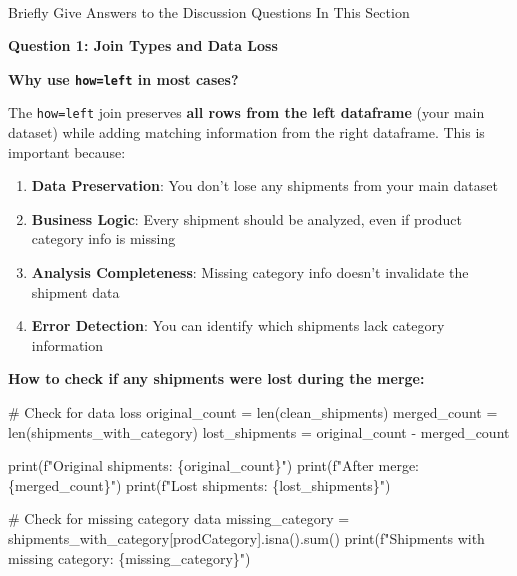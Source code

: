 \documentclass[
  letterpaper,
  DIV=11,
  numbers=noendperiod]{scrartcl}
\makeatletter
\let\oldparagraph\paragraph
\renewcommand{\paragraph}{
    \@ifstar
      \xxxParagraphStar
      \xxxParagraphNoStar
  }
\newcommand{\xxxParagraphStar}[1]{\oldparagraph*{#1}\mbox{}}
\newcommand{\xxxParagraphNoStar}[1]{\oldparagraph{#1}\mbox{}}
\newenvironment{Shaded}{\begin{snugshade}}{\end{snugshade}}
\newcommand{\BuiltInTok}[1]{\textcolor[rgb]{0.00,0.23,0.31}{#1}}
\newcommand{\CommentTok}[1]{\textcolor[rgb]{0.37,0.37,0.37}{#1}}
\newcommand{\NormalTok}[1]{\textcolor[rgb]{0.00,0.23,0.31}{#1}}
\newcommand{\OperatorTok}[1]{\textcolor[rgb]{0.37,0.37,0.37}{#1}}
\newcommand{\SpecialCharTok}[1]{\textcolor[rgb]{0.37,0.37,0.37}{#1}}
\newcommand{\SpecialStringTok}[1]{\textcolor[rgb]{0.13,0.47,0.30}{#1}}
\newcommand{\StringTok}[1]{\textcolor[rgb]{0.13,0.47,0.30}{#1}}
\providecommand{\tightlist}{%
  \setlength{\itemsep}{0pt}\setlength{\parskip}{0pt}}
\makeatother
\begin{document}
\paragraph{Briefly Give Answers to the Discussion Questions In This
Section}\label{briefly-give-answers-to-the-discussion-questions-in-this-section-5}

\textbf{Question 1: Join Types and Data Loss}

\textbf{Why use \texttt{how=\textquotesingle{}left\textquotesingle{}} in
most cases?}

The \texttt{how=\textquotesingle{}left\textquotesingle{}} join preserves
\textbf{all rows from the left dataframe} (your main dataset) while
adding matching information from the right dataframe. This is important
because:

\begin{enumerate}
\def\labelenumi{\arabic{enumi}.}
\tightlist
\item
  \textbf{Data Preservation}: You don't lose any shipments from your
  main dataset
\item
  \textbf{Business Logic}: Every shipment should be analyzed, even if
  product category info is missing
\item
  \textbf{Analysis Completeness}: Missing category info doesn't
  invalidate the shipment data
\item
  \textbf{Error Detection}: You can identify which shipments lack
  category information
\end{enumerate}

\textbf{How to check if any shipments were lost during the merge:}

\begin{Shaded}
\begin{Highlighting}[]
\CommentTok{\# Check for data loss}
\NormalTok{original\_count }\OperatorTok{=} \BuiltInTok{len}\NormalTok{(clean\_shipments)}
\NormalTok{merged\_count }\OperatorTok{=} \BuiltInTok{len}\NormalTok{(shipments\_with\_category)}
\NormalTok{lost\_shipments }\OperatorTok{=}\NormalTok{ original\_count }\OperatorTok{{-}}\NormalTok{ merged\_count}

\BuiltInTok{print}\NormalTok{(}\SpecialStringTok{f"Original shipments: }\SpecialCharTok{\{}\NormalTok{original\_count}\SpecialCharTok{\}}\SpecialStringTok{"}\NormalTok{)}
\BuiltInTok{print}\NormalTok{(}\SpecialStringTok{f"After merge: }\SpecialCharTok{\{}\NormalTok{merged\_count}\SpecialCharTok{\}}\SpecialStringTok{"}\NormalTok{)}
\BuiltInTok{print}\NormalTok{(}\SpecialStringTok{f"Lost shipments: }\SpecialCharTok{\{}\NormalTok{lost\_shipments}\SpecialCharTok{\}}\SpecialStringTok{"}\NormalTok{)}

\CommentTok{\# Check for missing category data}
\NormalTok{missing\_category }\OperatorTok{=}\NormalTok{ shipments\_with\_category[}\StringTok{\textquotesingle{}prodCategory\textquotesingle{}}\NormalTok{].isna().}\BuiltInTok{sum}\NormalTok{()}
\BuiltInTok{print}\NormalTok{(}\SpecialStringTok{f"Shipments with missing category: }\SpecialCharTok{\{}\NormalTok{missing\_category}\SpecialCharTok{\}}\SpecialStringTok{"}\NormalTok{)}
\end{Highlighting}
\end{Shaded}
\end{document}
